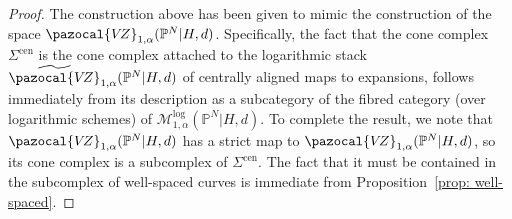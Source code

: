 \documentclass[11pt]{amsart}
\newcommand{\VZ}{\pazocal{V\!Z}}
\theoremstyle{definition}
\theoremstyle{definition}
\begin{document}
\begin{proof}
The construction above has been given to mimic the construction of the space $
\VZ_{1,\alpha}(\mathbb P^N|H,d)$. Specifically, the fact that the cone complex $\Sigma^{\mathrm{cen}}$ is the cone complex attached to the logarithmic stack $\widetilde{\VZ}_{1,\alpha}(\mathbb P^N|H,d)$ of centrally aligned maps to expansions, follows immediately from its description as a subcategory of the fibred category (over logarithmic schemes) of $\mathcal M^{\mathrm{log}}_{1,\alpha}(\mathbb P^N|H,d)$. To complete the result, we note that $
\VZ_{1,\alpha}(\mathbb P^N|H,d)$ has a strict map to $
\VZ_{1,\alpha}(\mathbb P^N|H,d)$, so its cone complex is a subcomplex of $\Sigma^{\mathrm{cen}}$. The fact that it must be contained in the subcomplex of well-spaced curves is immediate from Proposition~\ref{prop: well-spaced}.
\end{proof}
\end{document}
